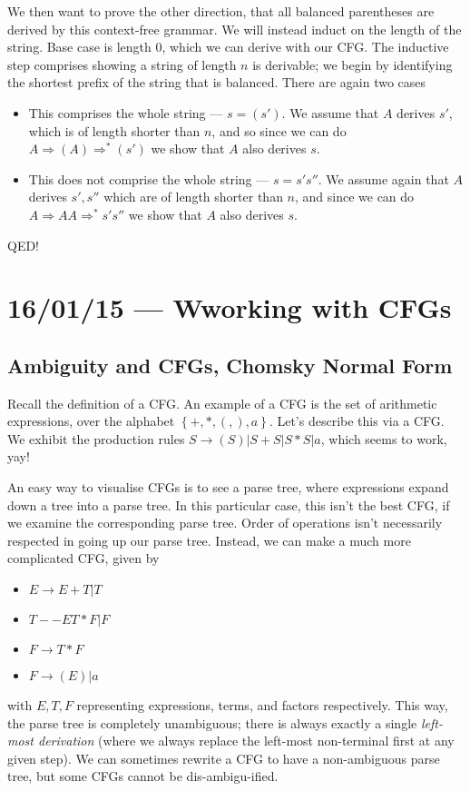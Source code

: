 \documentclass[10pt]{report}
\begin{document}
We then want to prove the other direction, that all balanced parentheses are derived by this context-free grammar. We will instead induct on the length of the string. Base case is length $0$, which we can derive with our CFG. The inductive step comprises showing a string of length $n$ is derivable; we begin by identifying the shortest prefix of the string that is balanced. There are again two cases
\begin{itemize}
    \item This comprises the whole string --- $s = (s')$. We assume that $A$ derives $s'$, which is of length shorter than $n$, and so since we can do $A \Rightarrow (A) \Rightarrow^* (s')$ we show that $A$ also derives $s$.
    \item This does not comprise the whole string --- $s = s's''$. We assume again that $A$ derives $s',s''$ which are of length shorter than $n$, and since we can do $A \Rightarrow AA \Rightarrow^* s's''$ we show that $A$ also derives $s$. 
\end{itemize}

QED!

\chapter{16/01/15 --- Wworking with CFGs}

\section{Ambiguity and CFGs, Chomsky Normal Form}

Recall the definition of a CFG. An example of a CFG is the set of arithmetic expressions, over the alphabet $\left\{ +, *, (,),a \right\}$. Let's describe this via a CFG. We exhibit the production rules $S \to (S) | S + S | S * S | a$, which seems to work, yay!

An easy way to visualise CFGs is to see a parse tree, where expressions expand down a tree into a parse tree. In this particular case, this isn't the best CFG, if we examine the corresponding parse tree. Order of operations isn't necessarily respected in going up our parse tree. Instead, we can make a much more complicated CFG, given by
\begin{itemize}
    \item $E \to E + T | T$
    \item $T --E T * F | F$
    \item $F \to T * F$
    \item $F \to (E) | a$
\end{itemize}
with $E, T, F$ representing expressions, terms, and factors respectively. This way, the parse tree is completely unambiguous; there is always exactly a single \emph{left-most derivation} (where we always replace the left-most non-terminal first at any given step). We can sometimes rewrite a CFG to have a non-ambiguous parse tree, but some CFGs cannot be dis-ambigu-ified.
\end{document}
